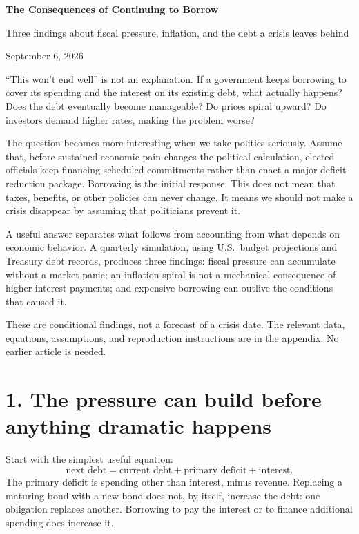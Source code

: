 \documentclass[11pt,letterpaper]{article}
\begin{document}
{\LARGE\bfseries\color{ink} The Consequences of Continuing to Borrow\par}
\vspace{4pt}
{\large Three findings about fiscal pressure, inflation, and the debt a crisis leaves behind\par}
{\small September 6, 2026\par}
\vspace{8pt}

\textquotedblleft This won't end well\textquotedblright{} is not an explanation.
If a government keeps borrowing to cover its spending and the interest on its
existing debt, what actually happens? Does the debt eventually become
manageable? Do prices spiral upward? Do investors demand higher rates, making
the problem worse?

The question becomes more interesting when we take politics seriously.
Assume that, before sustained economic pain changes the political calculation,
elected officials keep financing scheduled commitments rather than enact a
major deficit-reduction package. Borrowing is the initial response. This does
not mean that taxes, benefits, or other policies can never change. It means
we should not make a crisis disappear by assuming that politicians prevent it.

A useful answer separates what follows from accounting from what depends on
economic behavior. A quarterly simulation, using U.S.\ budget projections and
Treasury debt records, produces three findings: fiscal pressure can accumulate
without a market panic; an inflation spiral is not a mechanical consequence of
higher interest payments; and expensive borrowing can outlive the conditions
that caused it.

These are conditional findings, not a forecast of a crisis date. The relevant
data, equations, assumptions, and reproduction instructions are in the appendix.
No earlier article is needed.

\section*{1. The pressure can build before anything dramatic happens}

Start with the simplest useful equation:
\[
 \text{next debt}
 =\text{current debt}+\text{primary deficit}+\text{interest}.
\]
The primary deficit is spending other than interest, minus revenue. Replacing
a maturing bond with a new bond does not, by itself, increase the debt:
one obligation replaces another. Borrowing to pay the interest or to finance
additional spending does increase it.
\end{document}
